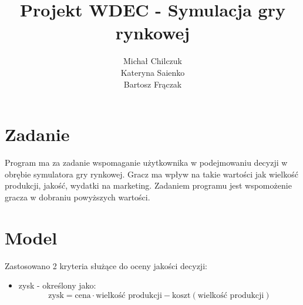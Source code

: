 \documentclass[10pt,a4paper]{article}
\author{Michał Chilczuk\\Kateryna Saienko
\\Bartosz Frączak}
\title{Projekt WDEC - Symulacja gry rynkowej}
\begin{document}
\maketitle
\section{Zadanie}
Program ma za zadanie wspomaganie użytkownika w podejmowaniu decyzji w obrębie symulatora gry rynkowej. Gracz ma wpływ na takie wartości jak wielkość produkcji, jakość, wydatki na marketing. Zadaniem programu jest wspomożenie gracza w dobraniu powyższych wartości.
\section{Model}
Zastosowano 2 kryteria służące do oceny jakości decyzji:
\begin{itemize}
\item zysk - określony jako:
\begin{equation*}
\text{zysk} = \text{cena} \cdot \text{wielkość produkcji} - \text{koszt}(\text{wielkość produkcji})
\end{equation*}


\end{itemize}
\end{document}
